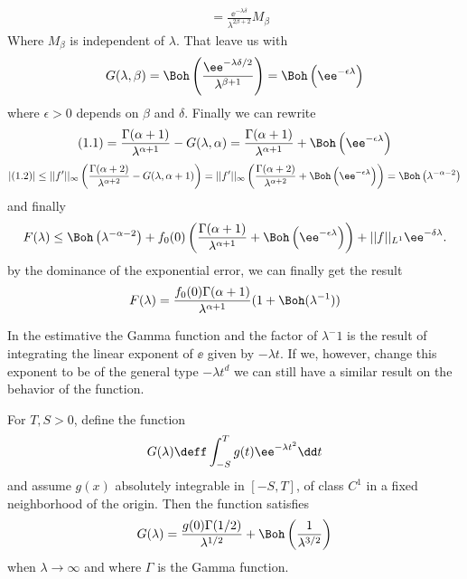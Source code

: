\begin{Mproof}
\begin{equation*}
\begin{split}
			& = \frac{\ee^{-\lambda \delta}}{\lambda^{2\beta + 2}} M_\beta
		\end{split}
	\end{equation*}
	Where $M_\beta$ is independent of $\lambda$. That leave us with
	$$G(\lambda, \beta) = \Boh\left(\frac{\ee^{-\lambda\delta/2}}{\lambda^{\beta+1}}\right) = \Boh\left(\ee^{-\epsilon\lambda}\right)$$
	where $\epsilon > 0$ depends on $\beta$ and $\delta$. Finally we can rewrite
	$$(1.1) = \frac{\Gamma(\alpha + 1)}{\lambda^{\alpha +1}} - G(\lambda, \alpha) =  \frac{\Gamma(\alpha + 1)}{\lambda^{\alpha+1}} + \Boh\left(\ee^{-\epsilon\lambda}\right)$$
	$$|(1.2)| \leq ||f'||_{\infty} \left( \frac{\Gamma(\alpha + 2)}{\lambda^{\alpha +2}} - G(\lambda, \alpha + 1) \right) = ||f'||_{\infty} \left( \frac{\Gamma(\alpha + 2)}{\lambda^{\alpha +2}} + \Boh\left(\ee^{-\epsilon\lambda}\right) \right) = \Boh\left(\lambda^{-\alpha-2}\right)$$
	and finally
	$$F(\lambda) \leq \Boh\left(\lambda^{-\alpha-2}\right) + f_0(0) \left( \frac{\Gamma(\alpha + 1)}{\lambda^{\alpha+1}} + \Boh\left(\ee^{-\epsilon\lambda}\right) \right) + ||f||_{L^1} \ee^{-\delta \lambda}.$$
	by the dominance of the exponential error, we can finally get the result
	$$F(\lambda) = \frac{f_0(0) \Gamma(\alpha + 1)}{\lambda^{\alpha + 1}} (1 + \Boh(\lambda^{-1}))$$
\end{Mproof}

In the estimative the Gamma function and the factor of $\lambda^-1$ is the result of integrating the linear exponent of $\ee$ given by $-\lambda t$. If we, however, change this exponent to be of the general type $-\lambda t^d$ we can still have a similar result on the behavior of the function.

\begin{prop}	
	For $T, S > 0$, define the function
	$$G(\lambda) \deff \int_{-S}^{T} g(t) \ee^{-\lambda t^2} \dd t$$
	and assume $g(x)$ absolutely integrable in $[-S, T]$, of class $C^1$ in a fixed neighborhood of the origin. Then the function satisfies
	\begin{equation}
		G(\lambda) = \frac{g(0) \Gamma(1/2)}{\lambda^{1/2}} + \Boh \left(\frac{1}{\lambda^{3/2}} \right)
	\end{equation}
	when $\lambda \rightarrow \infty$ and where $\Gamma$ is the Gamma function.
	\label{prop: cor watson}
\end{prop}

